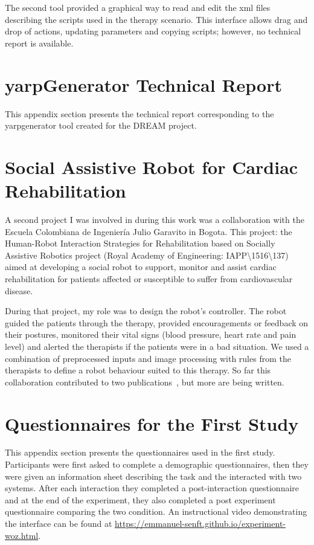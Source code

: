 The second tool provided a graphical way to read and edit the xml files describing the scripts used in the therapy scenario. This interface allows drag and drop of actions, updating parameters and copying scripts; however, no technical report is available.

\cleartooddpage
\chapter{yarpGenerator Technical Report} \label{app:yarpgenerator}
This appendix section presents the technical report corresponding to the yarpgenerator tool created for the DREAM project.

\cleartooddpage
\chapter{Social Assistive Robot for Cardiac Rehabilitation} \label{app:Colombia}

A  second project I was involved in during this work was a collaboration with the Escuela Colombiana de Ingeniería Julio Garavito in Bogota. This project:  the Human-Robot Interaction Strategies for Rehabilitation based on Socially Assistive Robotics project (Royal Academy of Engineering: IAPP\textbackslash1516\textbackslash137) aimed at developing a social robot to support, monitor and assist cardiac rehabilitation for patients affected or susceptible to suffer from cardiovascular disease.

During that project, my role was to design the robot's controller. The robot guided the patients through the therapy, provided encouragements or feedback on their postures, monitored their vital signs (blood pressure, heart rate and pain level) and alerted the therapists if the patients were in a bad situation. We used a combination of preprocessed inputs and image processing with rules from the therapists to define a robot behaviour suited to this therapy. So far this collaboration contributed to two publications~\citep{lara2017human,casas2018social}, but more are being written.

\cleartooddpage
\chapter{Questionnaires for the First Study} \label{app:woz_questionnaires}
This appendix section presents the questionnaires used in the first study. Participants were first asked to complete a demographic questionnaires, then they were given an information sheet describing the task and the interacted with two systems. After each interaction they completed a post-interaction questionnaire and at the end of the experiment, they also completed a post experiment questionnaire comparing the two condition. An instructional video demonstrating the interface can be found at  \url{https://emmanuel-senft.github.io/experiment-woz.html}.

